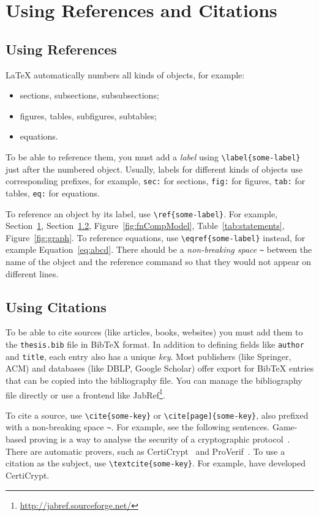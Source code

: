 \section{Using References and Citations}
\label{sec:refs-cites}

\subsection{Using References}
LaTeX automatically numbers all kinds of objects, for example:
\begin{itemize}
    \item sections, subsections, subsubsections;
    \item figures, tables, subfigures, subtables;
    \item equations.
\end{itemize}
To be able to reference them, you must add a \emph{label} using \verb|\label{some-label}| just after the numbered object.
Usually, labels for different kinds of objects use corresponding prefixes, for example, \verb|sec:| for sections, \verb|fig:| for figures, \verb|tab:| for tables, \verb|eq:| for equations.

To reference an object by its label, use \verb|\ref{some-label}|.
For example, Section~\ref{sec:refs-cites}, Section~\ref{sec:cites}, Figure~\ref{fig:fnCompModel}, Table~\ref{tab:statements}, Figure~\ref{fig:graph}.
To reference equations, use \verb|\eqref{some-label}| instead, for example Equation~\eqref{eq:abcd}.
There should be a \emph{non-breaking space} \verb|~| between the name of the object and the reference command so that they would not appear on different lines.


\subsection{Using Citations}
\label{sec:cites}

To be able to cite sources (like articles, books, websites) you must add them to the \verb|thesis.bib| file in BibTeX format.
In addition to defining fields like \verb|author| and \verb|title|, each entry also has a unique \emph{key}.
Most publishers (like Springer, ACM) and databases (like DBLP, Google Scholar) offer export for BibTeX entries that can be copied into the bibliography file.
You can manage the bibliography file directly or use a frontend like JabRef\footnote{\url{http://jabref.sourceforge.net/}}.

To cite a source, use \verb|\cite{some-key}| or \verb|\cite[page]{some-key}|, also prefixed with a non-breaking space \verb|~|.
For example, see the following sentences.
Game-based proving is a way to analyse the security of a cryptographic protocol~\cite{GameB_1,GameB_2}.
There are automatic provers, such as CertiCrypt~\cite{certiCrypt} and ProVerif~\cite{proVerif}.
To use a citation as the subject, use \verb|\textcite{some-key}|.
For example, \textcite{certiCrypt} have developed CertiCrypt.

